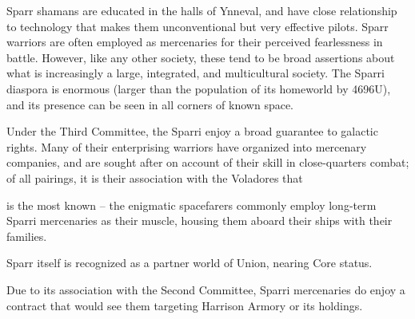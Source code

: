 Sparr shamans are educated in the halls of Ynneval, and have close relationship to technology
that makes them unconventional but very effective pilots. Sparr warriors are often employed as
mercenaries for their perceived fearlessness in battle. However, like any other society, these tend
to be broad assertions about what is increasingly a large, integrated, and multicultural society.
The Sparri diaspora is enormous (larger than the population of its homeworld by 4696U), and its
presence can be seen in all corners of known space.

Under the Third Committee, the Sparri enjoy a broad guarantee to galactic rights. Many of their
enterprising warriors have organized into mercenary companies, and are sought after on account
of their skill in close-quarters combat; of all pairings, it is their association with the Voladores that




is the most known -- the enigmatic spacefarers commonly employ long-term Sparri mercenaries
as their muscle, housing them aboard their ships with their families.

Sparr itself is recognized as a partner world of Union, nearing Core status.

Due to its association with the Second Committee, Sparri mercenaries do enjoy a contract that
would see them targeting Harrison Armory or its holdings.
